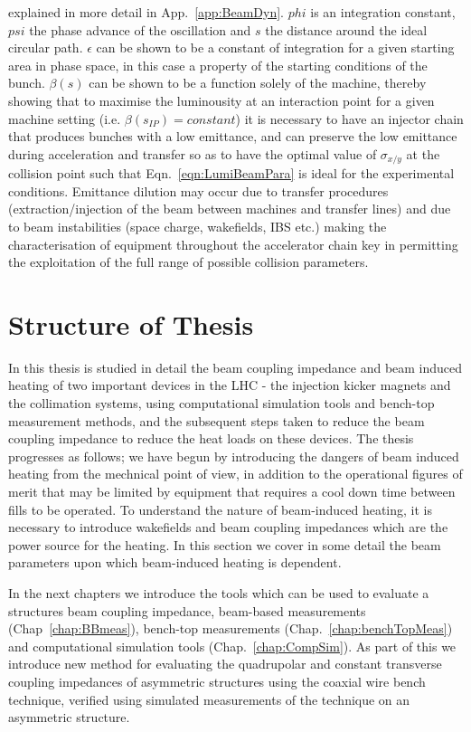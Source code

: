 explained in more detail in App.~\ref{app:BeamDyn}. $phi$ is an integration constant, $psi$ the phase advance of the oscillation and $s$ the distance around the ideal circular path. $\epsilon$ can be shown to be a constant of integration for a given starting area in phase space, in this case a property of the starting conditions of the bunch. $\beta (s)$ can be shown to be a function solely of the machine, thereby showing that to maximise the luminousity at an interaction point for a given machine setting (i.e. $\beta(s_{IP}) = constant$) it is necessary to have an injector chain that produces bunches with a low emittance, and can preserve the low emittance during acceleration and transfer so as to have the optimal value of $\sigma_{x/y}$ at the collision point such that Eqn.~\ref{eqn:LumiBeamPara} is ideal for the experimental conditions. Emittance dilution may occur due to transfer procedures (extraction/injection of the beam between machines and transfer lines) and due to beam instabilities (space charge, wakefields, IBS etc.) making the characterisation of equipment throughout the accelerator chain key in permitting the exploitation of the full range of possible collision parameters.

\section{Structure of Thesis}

In this thesis is studied in detail the beam coupling impedance and beam induced heating of two important devices in the LHC - the injection kicker magnets and the collimation systems, using computational simulation tools and bench-top measurement methods, and the subsequent steps taken to reduce the beam coupling impedance to reduce the heat loads on these devices. The thesis progresses as follows; we have begun by introducing the dangers of beam induced heating from the mechnical point of view, in addition to the operational figures of merit that may be limited by equipment that requires a cool down time between fills to be operated. To understand the nature of beam-induced heating, it is necessary to introduce wakefields and beam coupling impedances which are the power source for the heating. In this section we cover in some detail the beam parameters upon which beam-induced heating is dependent.

In the next chapters we introduce the tools which can be used to evaluate a structures beam coupling impedance, beam-based measurements (Chap~\ref{chap:BBmeas}), bench-top measurements (Chap.~\ref{chap:benchTopMeas}) and computational simulation tools (Chap.~\ref{chap:CompSim}). As part of this we introduce new method for evaluating the quadrupolar and constant transverse coupling impedances of asymmetric structures using the coaxial wire bench technique, verified using simulated measurements of the technique on an asymmetric structure.

